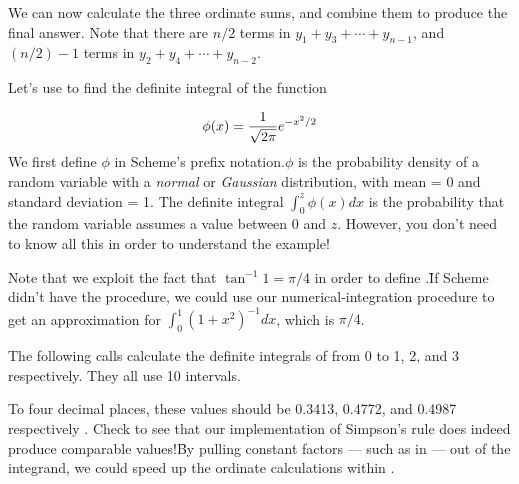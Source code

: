 
\n We can now calculate the three ordinate sums, and
combine them to produce the final answer.  Note
that there are $n/2$ terms in $y_1 + y_3 + \cdots +
y_{n-1}$, and $(n/2) - 1$ terms in $y_2 + y_4 + \cdots
+ y_{n-2}$.


\n Let's use  to find the definite
integral of the function 

$$
\phi(x) = {1\over \sqrt{2\pi}} e^{-x^2/2}
$$
%
We first define $\phi$ in Scheme's prefix
notation.\f{$\phi$
is the probability density of a
random variable with a {\em normal} or {\em Gaussian}
distribution, with mean = 0 and standard deviation = 1.
The definite integral $\int_0^z \phi(x) dx$
is the probability that the random
variable assumes a value between 0 and $z$.  
However, you don't need to know all this in
order to understand the example!}


\n Note that we exploit the fact that $\tan^{-1} 1 =
\pi/4$ in order to define .\f{If Scheme didn't
have the  procedure, we could use our
numerical-integration procedure to get an approximation
for $\int_0^1 (1 + x^2)^{-1} dx$, which is $\pi/4$.}
 
The following calls calculate the definite integrals of
 from 0 to 1, 2, and 3 respectively.  They
all use 10 intervals.


\n To four decimal places, these values should be
0.3413, 0.4772, and 0.4987 respectively \cite[Table
26.1]{hmf}.  Check to see that our implementation
of Simpson's rule does indeed produce comparable
values!\f{By pulling constant factors --- such as  in  --- out of the
integrand, we could speed up the ordinate calculations
within .} 

